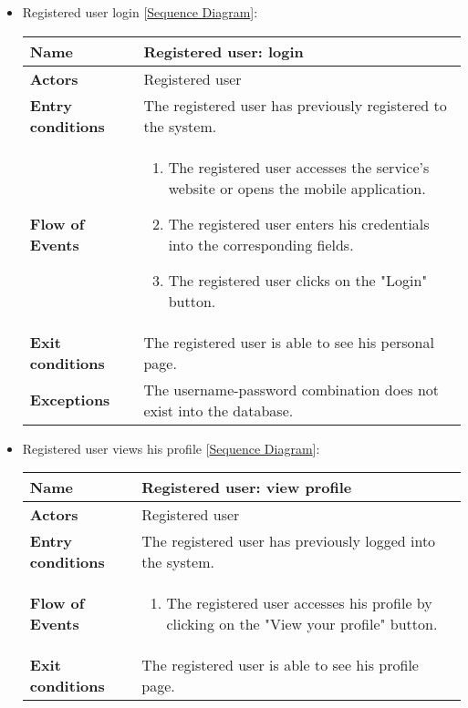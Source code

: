 \begin{itemize}
		\item Registered user login [\hyperlink{Login}{Sequence Diagram}]:
	\begin{table}[H]
		\centering
		\begin{tabular}{| m{3.5cm} | m{9.5cm} |}
			\hline
			\textbf{Name} & Registered user: login\\
			\hline
			\textbf{Actors} & Registered user\\
			\hline
			\textbf{Entry conditions} & The registered user has previously registered to the system.\\
			\hline
			\textbf{Flow of Events} & 
			\begin{enumerate}
				\item The registered user accesses the service's website or opens the mobile application.
				\item The registered user enters his credentials into the corresponding fields.
				\item The registered user clicks on the "Login" button.
			\end{enumerate} \\
			\hline
			\textbf{Exit conditions} & The registered user is able to see his personal page.\\
			\hline
			\textbf{Exceptions} & The username-password combination does not exist into the database. \\
			\hline
		\end{tabular}
	\end{table}
\newpage
	\item Registered user views his profile [\hyperlink{ViewProfile}{Sequence Diagram}]:
	\begin{table}[H]
		\centering
		\begin{tabular}{| m{3.5cm} | m{9.5cm} |}
			\hline
			\textbf{Name} & Registered user: view profile\\
			\hline
			\textbf{Actors} & Registered user\\
			\hline
			\textbf{Entry conditions} & The registered user has previously logged into the system.\\
			\hline
			\textbf{Flow of Events} & 
			\begin{enumerate}
				\item The registered user accesses his profile by clicking on the "View your profile" button.
			\end{enumerate} \\
			\hline
			\textbf{Exit conditions} & The registered user is able to see his profile page.\\

\end{tabular}
\end{table}
\end{itemize}
